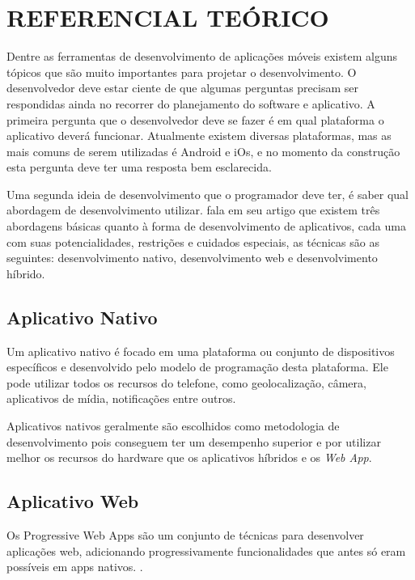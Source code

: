 
\chapter{REFERENCIAL TEÓRICO}
\label{chap:ref_teo}


Dentre as ferramentas de desenvolvimento de aplicações móveis existem alguns tópicos que são muito importantes para projetar o desenvolvimento. O desenvolvedor deve estar ciente de que algumas perguntas precisam ser respondidas ainda no recorrer do planejamento do software e aplicativo. A primeira pergunta que o desenvolvedor deve se fazer é em qual plataforma o aplicativo deverá funcionar. Atualmente existem diversas plataformas, mas as mais comuns de serem utilizadas é Android e iOs, e no momento da construção esta pergunta deve ter uma resposta bem esclarecida.

Uma segunda ideia de desenvolvimento que o programador deve ter, é saber qual abordagem de desenvolvimento utilizar.
\cite{apps} fala em seu artigo que existem três abordagens básicas quanto à forma de desenvolvimento de aplicativos, cada uma com suas potencialidades, restrições e cuidados especiais, as técnicas são as seguintes: desenvolvimento nativo, desenvolvimento web e desenvolvimento híbrido.

\section{Aplicativo Nativo}
Um aplicativo nativo é focado em uma plataforma ou conjunto de dispositivos específicos e desenvolvido pelo modelo de programação desta plataforma. Ele pode utilizar todos os recursos do telefone, como geolocalização, câmera, aplicativos de mídia, notificações entre outros. 

Aplicativos nativos geralmente são escolhidos como metodologia de desenvolvimento pois conseguem ter um desempenho superior e por utilizar melhor os recursos do hardware que os aplicativos híbridos e os \textit{Web App}.


\section{Aplicativo Web}
Os Progressive Web Apps são um conjunto de técnicas para desenvolver aplicações web, adicionando progressivamente funcionalidades que antes só eram possíveis em apps nativos. . 

